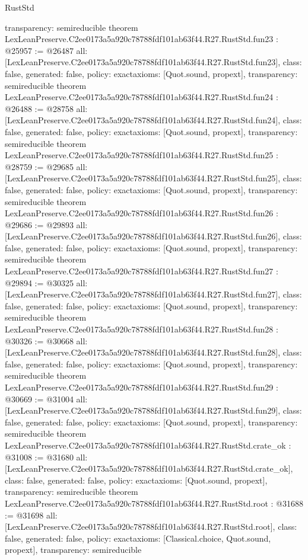 \begin{lexlean}{RustStd}
\begin{coremodule}
{  transparency: semireducible
}
theorem LexLeanPreserve.C2ee0173a5a920c78788fdf101ab63f44.R27.RustStd.fun23 : @25957 := @26487 {
  all: [LexLeanPreserve.C2ee0173a5a920c78788fdf101ab63f44.R27.RustStd.fun23],
  class: false,
  generated: false,
  policy: exact{axioms: [Quot.sound, propext]},
  transparency: semireducible
}
theorem LexLeanPreserve.C2ee0173a5a920c78788fdf101ab63f44.R27.RustStd.fun24 : @26488 := @28758 {
  all: [LexLeanPreserve.C2ee0173a5a920c78788fdf101ab63f44.R27.RustStd.fun24],
  class: false,
  generated: false,
  policy: exact{axioms: [Quot.sound, propext]},
  transparency: semireducible
}
theorem LexLeanPreserve.C2ee0173a5a920c78788fdf101ab63f44.R27.RustStd.fun25 : @28759 := @29685 {
  all: [LexLeanPreserve.C2ee0173a5a920c78788fdf101ab63f44.R27.RustStd.fun25],
  class: false,
  generated: false,
  policy: exact{axioms: [Quot.sound, propext]},
  transparency: semireducible
}
theorem LexLeanPreserve.C2ee0173a5a920c78788fdf101ab63f44.R27.RustStd.fun26 : @29686 := @29893 {
  all: [LexLeanPreserve.C2ee0173a5a920c78788fdf101ab63f44.R27.RustStd.fun26],
  class: false,
  generated: false,
  policy: exact{axioms: [Quot.sound, propext]},
  transparency: semireducible
}
theorem LexLeanPreserve.C2ee0173a5a920c78788fdf101ab63f44.R27.RustStd.fun27 : @29894 := @30325 {
  all: [LexLeanPreserve.C2ee0173a5a920c78788fdf101ab63f44.R27.RustStd.fun27],
  class: false,
  generated: false,
  policy: exact{axioms: [Quot.sound, propext]},
  transparency: semireducible
}
theorem LexLeanPreserve.C2ee0173a5a920c78788fdf101ab63f44.R27.RustStd.fun28 : @30326 := @30668 {
  all: [LexLeanPreserve.C2ee0173a5a920c78788fdf101ab63f44.R27.RustStd.fun28],
  class: false,
  generated: false,
  policy: exact{axioms: [Quot.sound, propext]},
  transparency: semireducible
}
theorem LexLeanPreserve.C2ee0173a5a920c78788fdf101ab63f44.R27.RustStd.fun29 : @30669 := @31004 {
  all: [LexLeanPreserve.C2ee0173a5a920c78788fdf101ab63f44.R27.RustStd.fun29],
  class: false,
  generated: false,
  policy: exact{axioms: [Quot.sound, propext]},
  transparency: semireducible
}
theorem LexLeanPreserve.C2ee0173a5a920c78788fdf101ab63f44.R27.RustStd.crate_ok : @31008 := @31680 {
  all: [LexLeanPreserve.C2ee0173a5a920c78788fdf101ab63f44.R27.RustStd.crate_ok],
  class: false,
  generated: false,
  policy: exact{axioms: [Quot.sound, propext]},
  transparency: semireducible
}
theorem LexLeanPreserve.C2ee0173a5a920c78788fdf101ab63f44.R27.RustStd.root : @31688 := @31698 {
  all: [LexLeanPreserve.C2ee0173a5a920c78788fdf101ab63f44.R27.RustStd.root],
  class: false,
  generated: false,
  policy: exact{axioms: [Classical.choice, Quot.sound, propext]},
  transparency: semireducible
}


\end{coremodule}
\end{lexlean}

